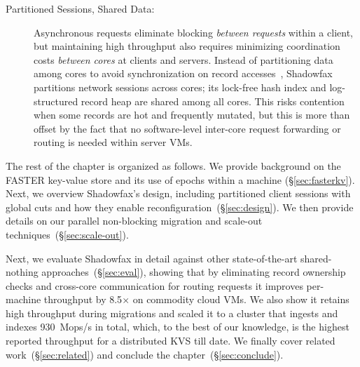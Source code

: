 \begin{description}
\item[Partitioned Sessions, Shared Data:]
Asynchronous requests eliminate blocking {\em between requests} within a client, but
maintaining high throughput also requires minimizing coordination
costs {\em between cores} at clients and servers.
%
Instead of partitioning data among cores to avoid synchronization on record
accesses~\cite{hstore,voltdb,mica,seastar}, Shadowfax partitions network
sessions across cores; its lock-free hash index and log-structured record heap
are shared among all cores.
%
This risks contention when some records are hot and frequently
mutated, but this is more than offset by the fact that no software-level
inter-core request forwarding or routing is needed within server VMs.

\end{description}

The rest of the chapter is organized as follows. We provide background on the FASTER
key-value store and its use of epochs within a machine (\S\ref{sec:fasterkv}). Next,
we overview Shadowfax's design, including partitioned client
sessions with global cuts and how they enable
reconfiguration~(\S\ref{sec:design}). We then provide details on our parallel
non-blocking migration and scale-out techniques~(\S\ref{sec:scale-out}).
%
\iffalse
In the remainder of this paper, we describe how the key synchronization
mechanisms at the core of \faster{}'s design (\S\ref{sec:epochs}) naturally led
to Shadowfax's sessions that extend global cuts over the network
(\S\ref{sec:sessions}). We describe how this enables Shadowfax to perform the
same over the network as with a local \faster{}
instance~(\S\ref{sec:eval:clients}), and we describe how they enable
reconfiguration~(\S\ref{sec:ownership}) and parallel data
migration~(\S\ref{sec:scale-out}). We also describe how Shadowfax does this
while supporting larger-than-memory datasets that span SSD and cloud blob
storage.
\fi
%
Next, we evaluate Shadowfax in detail against other state-of-the-art shared-nothing
approaches~(\S\ref{sec:eval}), showing that by eliminating record ownership
checks and cross-core communication for routing requests it improves
per-machine throughput by 8.5$\times$ on commodity cloud VMs.
%
We also show it retains high throughput during migrations and scaled it
to a
cluster that ingests and indexes 930~Mops/s in total,
%
which, to the best of our knowledge, is the highest
reported throughput for a distributed KVS till date. We finally cover
related work~(\S\ref{sec:related}) and conclude the chapter~(\S\ref{sec:conclude}).
